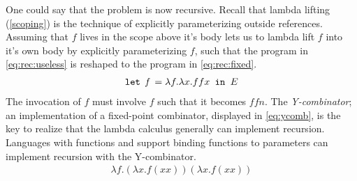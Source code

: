 One could say that the problem is now recursive.
Recall that lambda lifting (\autoref{scoping}) is the technique of explicitly parameterizing outside references.
Assuming that $f$ lives in the scope above it's body lets us to lambda lift $f$ into it's own body by explicitly parameterizing $f$, such that the program in \autoref{eq:rec:useless} is reshaped to the program in \autoref{eq:rec:fixed}.
\begin{align}
  \texttt{let } \textit{f } = \lambda f.\lambda x. f f x \texttt{ in } E\label{eq:rec:fixed}
\end{align}
The invocation of $f$ must involve $f$ such that it becomes $f f n$.
The \textit{Y-combinator}; an implementation of a fixed-point combinator, displayed in \autoref{eq:ycomb}, is the key to realize that the lambda calculus generally can implement recursion.
Languages with functions and support binding functions to parameters can implement recursion with the Y-combinator.
\begin{align}
    \lambda f . (\lambda x . f (x x)) (\lambda x . f (x x))
    \label{eq:ycomb}
\end{align}

